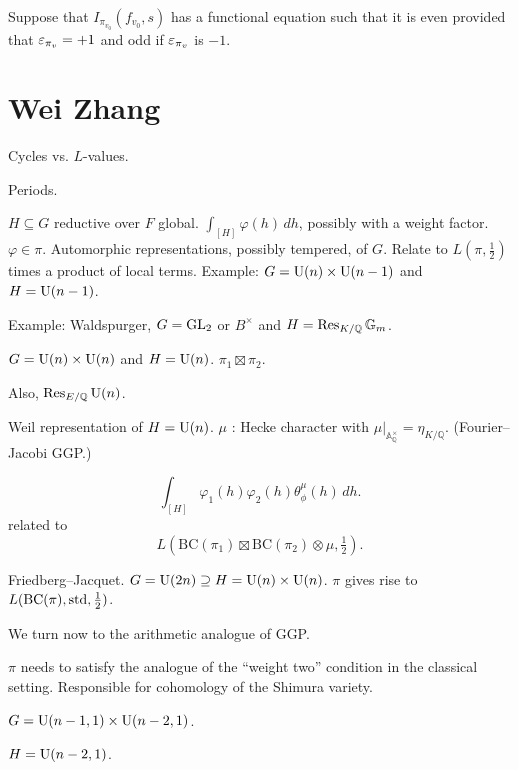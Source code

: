 \documentclass[reqno]{amsart} 
\begin{document}
Suppose that $I_{\pi_{v_0}}(f_{v_0}, s)$ has a functional equation such that it is even provided that $\varepsilon_{\pi_v} = +1$ and odd if $\varepsilon_{\pi_v}$ is $-1$.









\section{Wei Zhang}\label{sec:cnfhlpuzlg}

Cycles vs. $L$-values.

Periods.

$H \subseteq G$ reductive over $F$ global.  $\int_{[H]} \varphi(h) \, d h$, possibly with a weight factor.  $\varphi \in \pi$.  Automorphic representations, possibly tempered, of $G$.  Relate to $L(\pi, \tfrac{1}{2})$ times a product of local terms.  Example: $G = \operatorname{U}(n) \times \operatorname{U}(n-1)$ and $H = \operatorname{U}(n-1)$.

Example: Waldspurger, $G = \operatorname{GL}_2$ or $B^\times $ and $H = \operatorname{Res}_{K / \mathbb{Q}}\mathbb{G}_m$.

$G = \operatorname{U}(n) \times \operatorname{U}(n)$ and $H = \operatorname{U}(n)$.  $\pi_1 \boxtimes \pi_2$.

Also, $\operatorname{Res}_{E / \mathbb{Q}} \operatorname{U}(n)$.

Weil representation of $H =\operatorname{U}(n)$.  $\mu$ : Hecke character with $\mu |_{\mathbb{A}_{\mathbb{Q}}^\times } = \eta_{K/\mathbb{Q}}$.  (Fourier--Jacobi GGP.)

\begin{equation*}
\int_{[H]} \varphi_1(h) \varphi_2(h) \theta_\phi^\mu(h) \, d h.
\end{equation*}
related to
\begin{equation*}
L\left(\mathrm{BC}(\pi_1) \boxtimes \mathrm{BC}(\pi_2) \otimes \mu, \tfrac{1}{2}\right).
\end{equation*}

Friedberg--Jacquet.  $G = \operatorname{U}(2 n) \supseteq H = \operatorname{U}(n) \times \operatorname{U}(n)$.  $\pi$ gives rise to $L(\mathrm{BC}(\pi), \operatorname{std}, \tfrac{1}{2})$.

We turn now to the arithmetic analogue of GGP.

$\pi$ needs to satisfy the analogue of the ``weight two'' condition in the classical setting.  Responsible for cohomology of the Shimura variety.

$G = \operatorname{U}(n - 1, 1) \times \operatorname{U}(n - 2, 1)$.

$H = \operatorname{U}(n-2,1)$.
\end{document}
